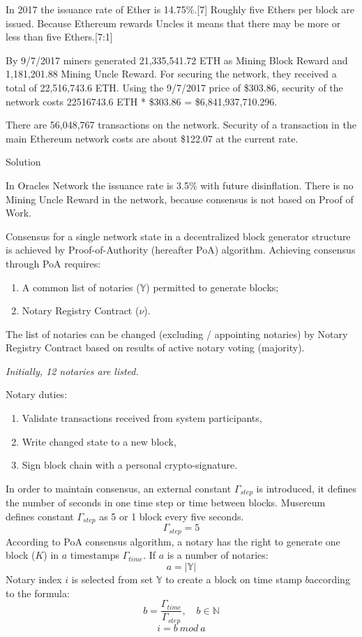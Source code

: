 \documentclass[12pt]{report}
\newcommand{\hlc}[1]{\colorbox{yellow!25}{#1}}
\begin{document}
In 2017 the issuance rate of Ether is 14.75\%.[7] Roughly five Ethers per block are issued. Because Ethereum rewards Uncles it means that there may be more or less than five Ethers.[7:1]

By 9/7/2017 miners generated 21,335,541.72 ETH as Mining Block Reward and 1,181,201.88 Mining Uncle Reward. For securing the network, they received a total of 22,516,743.6 ETH. Using the 9/7/2017 price of \$303.86, security of the network costs 22516743.6 ETH * \$303.86 = \$6,841,937,710.296.

There are 56,048,767 transactions on the network. Security of a transaction in the main Ethereum network costs are about \$122.07 at the current rate.

Solution

In Oracles Network the issuance rate is 3.5\% with future disinflation. There is no Mining Uncle Reward in the network, because consensus is not based on Proof of Work.

Consensus for a single network state in a decentralized block generator structure is achieved by Proof-of-Authority (hereafter PoA) algorithm. Achieving consensus through PoA requires:
\begin{enumerate}
\item A common list of notaries ($\mathbb{Y}$) permitted to generate blocks;
\item Notary Registry Contract ($\nu$).
\end{enumerate}
The list of notaries can be changed (excluding / appointing notaries) by Notary Registry Contract based on results of active notary voting (majority).

\textit{Initially, 12 notaries are listed.}

Notary \hlc{duties}: 
\begin{enumerate}
\item Validate transactions received from system participants,
\item \hlc{Write changed state to a new block},
\item \hlc{Sign block chain} with a personal crypto-signature.
\end{enumerate}

In order to maintain consensus, an external constant $\Gamma_{step}$ is introduced, it defines the number of seconds in one time step or time between blocks. Musereum defines constant $\Gamma_{step}$ as 5 or 1 block every five seconds.
\begin{equation}
\Gamma_{step} = 5
\end{equation}
According to PoA consensus algorithm, a notary has the right to generate one block ($K$) in $a$ \hlc{timestamps} $\Gamma_{time}$. If $a$ is a number of notaries:
\begin{equation}
a = |\mathbb{Y}|
\end{equation}
Notary index $i$ is selected from set $\mathbb{Y}$ to create a block on time stamp $b$according to the formula: 
\begin{equation}
b = \frac{\Gamma_{time}}{\Gamma_{step}},  \quad b \in \mathbb{N} 
\end{equation}
\begin{equation}
i = b \ mod \ a
\end{equation}
\end{document}
